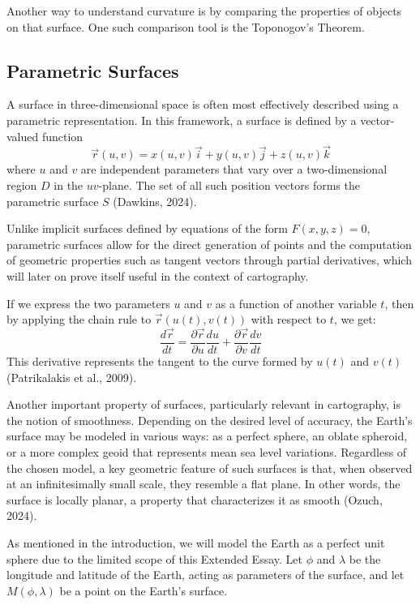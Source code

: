 Another way to understand curvature is by comparing the properties of objects on that surface. One such comparison tool is
the Toponogov's Theorem.

\pagebreak
\subsection{Parametric Surfaces}
\vspace*{-10pt}
A surface in three-dimensional space is often most effectively 
described using a parametric representation. In this framework, a 
surface is defined by a vector-valued function
\[
    \vec{r}(u,v)=x(u,v)\vec{i} + y(u,v)\vec{j} + z(u,v)\vec{k}
\]
where $u$ and $v$ are independent parameters that vary over a 
two-dimensional region $D$ in the $uv$-plane. The set of all such position 
vectors forms the parametric surface $S$ (Dawkins, 2024).

Unlike implicit surfaces defined by equations of the form $F(x,y,z)=0$, parametric
surfaces allow for the direct generation of points and the computation of geometric
properties such as tangent vectors through partial derivatives, which will later 
on prove itself useful in the context of cartography.

If we express the two parameters $u$ and $v$ as a function of another variable
$t$, then by applying the chain rule to $\vec{r}(u(t),v(t))$ with respect to 
$t$, we get:
\[
    \frac{d\vec{r}}{dt}=\frac{\partial \vec{r}}{\partial u}\frac{du}{dt}+\frac{\partial \vec{r}}{\partial v}\frac{dv}{dt}
\]
This derivative represents the tangent to the curve formed by $u(t)$ and $v(t)$ 
(Patrikalakis et al., 2009).

Another important property of surfaces, particularly relevant in cartography, 
is the notion of smoothness. Depending on the desired level of accuracy, the 
Earth's surface may be modeled in various ways: as a perfect sphere, an oblate 
spheroid, or a more complex geoid that represents mean sea level variations. 
Regardless of the chosen model, a key geometric feature of such surfaces is 
that, when observed at an infinitesimally small scale, they resemble a flat 
plane. In other words, the surface is locally planar, a property that 
characterizes it as smooth (Ozuch, 2024).

As mentioned in the introduction, we will model the Earth as a perfect unit sphere
due to the limited scope of this Extended Essay. Let $\phi$ and $\lambda$ be
the longitude and latitude of the Earth, acting as parameters of the surface, 
and let $M(\phi,\lambda)$ be a point on the Earth's surface. 

